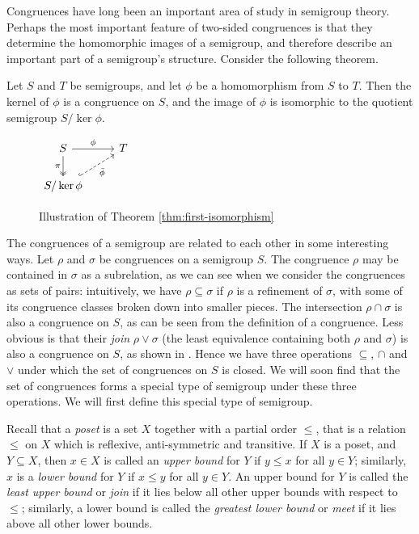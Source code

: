 Congruences have long been an important area of study in semigroup theory.
Perhaps the most important feature of two-sided congruences is that they
determine the homomorphic images of a semigroup, and therefore describe an
important part of a semigroup's structure.  Consider the following theorem.

\begin{theorem}
  \label{thm:first-isomorphism}
  Let $S$ and $T$ be semigroups, and let $\phi$ be a homomorphism from $S$ to
  $T$.  Then the kernel of $\phi$ is a congruence on $S$, and the image of
  $\phi$ is isomorphic to the quotient semigroup $S / \ker{\phi}$.
\end{theorem}

\begin{figure}[h]
  \centering
  $
  \begin{tikzcd}
    S \ar[d, two heads, "\pi"'] \ar[r, "\phi"] & T \\
    S / \ker{\phi} \ar[ur, dashed, hook, "\bar\phi"']
  \end{tikzcd}
  $
  \caption{Illustration of Theorem \ref{thm:first-isomorphism}}
  \label{fig:first-isomorphism-theorem}
\end{figure}

The congruences of a semigroup are related to each other in some interesting
ways.  Let $\rho$ and $\sigma$ be congruences on a semigroup $S$.  The
congruence $\rho$ may be contained in $\sigma$ as a subrelation, as we can see
when we consider the congruences as sets of pairs: intuitively, we have
$\rho \subseteq \sigma$ if $\rho$ is a refinement of $\sigma$, with some of its
congruence classes broken down into smaller pieces.  The intersection
$\rho \cap \sigma$ is also a congruence on $S$, as can be seen from the
definition of a congruence.  Less obvious is that their \textit{join}
$\rho \vee \sigma$ (the least equivalence containing both $\rho$ and $\sigma$)
is also a congruence on $S$, as shown in \cite[\S1.5]{howie}.  Hence we have
three operations $\subseteq$, $\cap$ and $\vee$ under which the set of
congruences on $S$ is closed.  We will soon find that the set of congruences
forms a special type of semigroup under these three operations.  We will first
define this special type of semigroup.

Recall that a \textit{poset} is a set $X$ together with a partial order $\leq$,
that is a relation $\leq$ on $X$ which is reflexive, anti-symmetric and
transitive.  If $X$ is a poset, and $Y \subseteq X$, then $x \in X$ is called an
\textit{upper bound} for $Y$ if $y \leq x$ for all $y \in Y$; similarly, $x$ is
a \textit{lower bound} for $Y$ if $x \leq y$ for all $y \in Y$.  An upper bound
for $Y$ is called the \textit{least upper bound} or \textit{join} if it lies
below all other upper bounds with respect to $\leq$; similarly, a lower bound is
called the \textit{greatest lower bound} or \textit{meet} if it lies above all
other lower bounds.    
   

